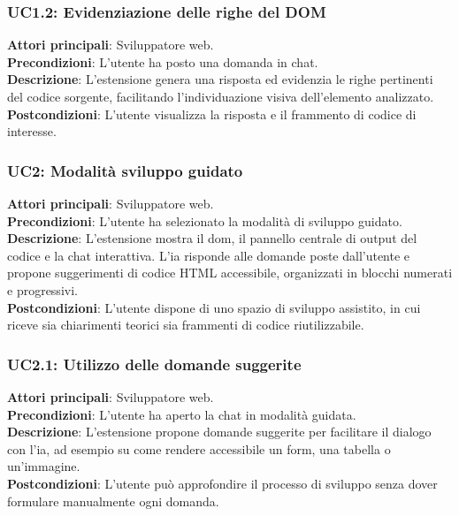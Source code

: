 \subsubsection*{UC1.2: Evidenziazione delle righe del DOM}
\noindent \textbf{Attori principali}: Sviluppatore web.\\
\textbf{Precondizioni}: L’utente ha posto una domanda in chat.\\
\textbf{Descrizione}: L’estensione genera una risposta ed evidenzia le righe pertinenti del codice sorgente, facilitando l’individuazione visiva dell’elemento analizzato.\\
\textbf{Postcondizioni}: L’utente visualizza la risposta e il frammento di codice di interesse.\\


\subsubsection*{UC2: Modalità sviluppo guidato}
\noindent \textbf{Attori principali}: Sviluppatore web.\\
\textbf{Precondizioni}: L’utente ha selezionato la modalità di sviluppo guidato.\\
\textbf{Descrizione}: L’estensione mostra il \acrshort{dom}, il pannello centrale di output del codice e la chat interattiva. L’\acrshort{ia} risponde alle domande poste dall’utente e propone suggerimenti di codice HTML accessibile, organizzati in blocchi numerati e progressivi.\\
\textbf{Postcondizioni}: L’utente dispone di uno spazio di sviluppo assistito, in cui riceve sia chiarimenti teorici sia frammenti di codice riutilizzabile.\\

\subsubsection*{UC2.1: Utilizzo delle domande suggerite}
\noindent \textbf{Attori principali}: Sviluppatore web.\\
\textbf{Precondizioni}: L’utente ha aperto la chat in modalità guidata.\\
\textbf{Descrizione}: L’estensione propone domande suggerite per facilitare il dialogo con l’\acrshort{ia}, ad esempio su come rendere accessibile un form, una tabella o un’immagine.\\
\textbf{Postcondizioni}: L’utente può approfondire il processo di sviluppo senza dover formulare manualmente ogni domanda.\\

